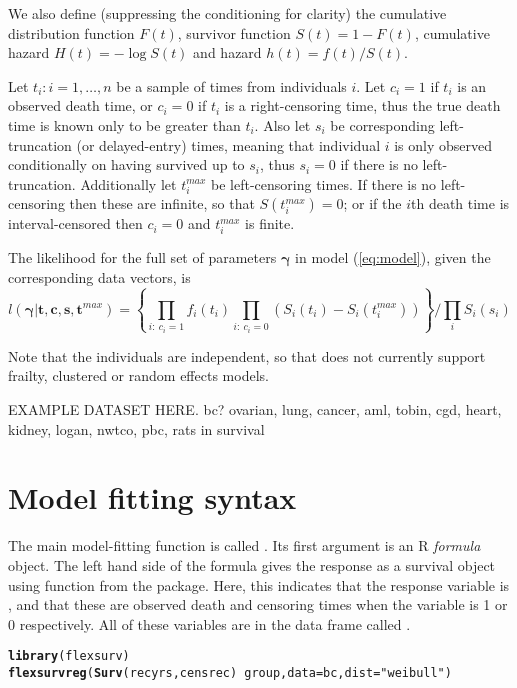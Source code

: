 \documentclass[nojss,nofooter]{jss}\usepackage[]{graphicx}\usepackage[]{color}
\makeatletter
\newcommand{\hlstr}[1]{\textcolor[rgb]{0.192,0.494,0.8}{#1}}%
\newcommand{\hlopt}[1]{\textcolor[rgb]{0,0,0}{#1}}%
\newcommand{\hlstd}[1]{\textcolor[rgb]{0.345,0.345,0.345}{#1}}%
\newcommand{\hlkwc}[1]{\textcolor[rgb]{0.333,0.667,0.333}{#1}}%
\newcommand{\hlkwd}[1]{\textcolor[rgb]{0.737,0.353,0.396}{\textbf{#1}}}%
\newenvironment{kframe}{%
 \def\at@end@of@kframe{}%
 \ifinner\ifhmode%
  \def\at@end@of@kframe{\end{minipage}}%
  \begin{minipage}{\columnwidth}%
 \fi\fi%
 \def\FrameCommand##1{\hskip\@totalleftmargin \hskip-\fboxsep
 \colorbox{shadecolor}{##1}\hskip-\fboxsep
     \hskip-\linewidth \hskip-\@totalleftmargin \hskip\columnwidth}%
 \MakeFramed {\advance\hsize-\width
   \@totalleftmargin\z@ \linewidth\hsize
   \@setminipage}}%
 {\par\unskip\endMakeFramed%
 \at@end@of@kframe}
\newenvironment{knitrout}{}{} %
\makeatother
\begin{document}
We also define (suppressing the conditioning for clarity) the
cumulative distribution function $F(t)$, survivor function $S(t) = 1 -
F(t)$, cumulative hazard $H(t) = -\log S(t)$ and hazard $h(t) =
f(t)/S(t)$.

Let $t_i: i=1,\ldots, n$ be a sample of times from individuals $i$.
Let $c_i=1$ if $t_i$ is an observed death time, or $c_i=0$ if $t_i$ is
a right-censoring time, thus the true death time is known only to be
greater than $t_i$.  Also let $s_i$ be corresponding left-truncation
(or delayed-entry) times, meaning that individual $i$ is only observed
conditionally on having survived up to $s_i$, thus $s_i=0$ if there is
no left-truncation.  Additionally let $t^{max}_i$ be left-censoring
times.  If there is no left-censoring then these are infinite, so that
$S(t^{max}_i)=0$; or if the $i$th death time is interval-censored then
$c_i=0$ and $t^{max}_i$ is finite.

The likelihood for the full set of parameters $\bm{\gamma}$ in model
(\ref{eq:model}), given the corresponding data vectors, is
\begin{equation}
  \label{eq:lik}
  l(\bm{\gamma} | \mathbf{t},\mathbf{c},\mathbf{s},\mathbf{t}^{max}) = \left\{ \prod_{i:\ c_i=1} f_i(t_i) \prod_{i:\ c_i=0} \left(S_i(t_i) - S_i(t^{max}_i)\right)\right\} / \prod_i S_i(s_i)  
\end{equation}

Note that the individuals are independent, so that  does not
currently support frailty, clustered or random effects models.

EXAMPLE DATASET HERE.  bc?  ovarian, lung, cancer, aml, tobin, cgd,
heart, kidney, logan, nwtco, pbc, rats in survival


\section{Model fitting syntax} 

The main model-fitting function is called .  Its
first argument is an R \emph{formula} object.  The left hand side of
the formula gives the response as a survival object using 
function from the  package.  Here, this indicates that
the response variable is , and that these are observed
death and censoring times when the variable  is 1 or 0
respectively.  All of these variables are in the data frame called
.  
\begin{knitrout}
\color{fgcolor}\begin{kframe}
\begin{alltt}
\hlkwd{library}\hlstd{(flexsurv)}
\hlkwd{flexsurvreg}\hlstd{(}\hlkwd{Surv}\hlstd{(recyrs, censrec)} \hlopt{~} \hlstd{group,} \hlkwc{data}\hlstd{=bc,} \hlkwc{dist}\hlstd{=}\hlstr{"weibull"}\hlstd{)}
\end{alltt}
\end{kframe}
\end{knitrout}
\end{document}
